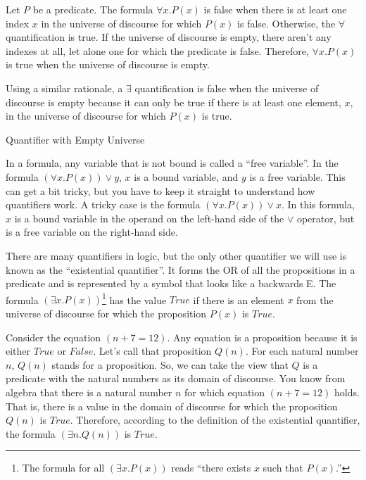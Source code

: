 {\begin{aside}
Let $P$ be a predicate.
The formula $\forall x.P(x)$ is false when there is
at least one index $x$ in the universe of discourse
for which $P(x)$ is false.
Otherwise, the $\forall$ quantification is true.
If the universe of discourse is empty,
there aren't any indexes at all,
let alone one for which the predicate is false.
Therefore, $\forall x.P(x)$ is true
when the universe of discourse is empty.

Using a similar rationale, a $\exists$
quantification
is false when the universe of discourse is empty
because it can only be true if there is
at least one element, $x$, in the universe of discourse
for which $P(x)$ is true.
\caption{Quantifier with Empty Universe}
\label{empty-forall}
\end{aside}

In a formula, any variable that is not bound is
called a
\label{def:free-variable}``free variable''.
In the formula $(\forall x.P(x)) \vee y$,
$x$ is a bound variable, and $y$ is a free variable.
This can get a bit tricky, but you have to keep it
straight to understand how quantifiers work.
A tricky case is the formula
$(\forall x.P(x)) \vee x$.
In this formula, $x$ is a bound variable in the
operand on the left-hand side of the $\vee$ operator,
but is a free variable on the right-hand side.

There are many quantifiers in logic, but the only other
quantifier we will use is known as the
\label{def:existential-quantifier}
``existential quantifier''.
It forms the OR of all the propositions in a predicate
and is represented by a symbol that looks like a backwards E.
The  formula $(\exists x.P(x))$\footnote{The
formula for all $(\exists x.P(x))$ reads
``there exists $x$ such that $P(x)$.''}
has the value $True$
if there is an element $x$ from the universe of discourse
for which the proposition $P(x)$ is $True$.

Consider the equation $(n + 7 = 12)$.
Any equation is a proposition because it is either
$True$ or $False$. Let's call that proposition $Q(n)$.
For each natural number $n$,
$Q(n)$ stands for a proposition.
So, we can take the view that $Q$ is a predicate
with the natural numbers as its domain of discourse.
You know from algebra that there is a natural number
$n$ for which equation $(n + 7 = 12)$ holds.
That is, there is a value in the domain
of discourse for which the proposition $Q(n)$ is $True$.
Therefore, according to the definition of the
existential quantifier,
the formula $(\exists n.Q(n))$ is $True$.

}
